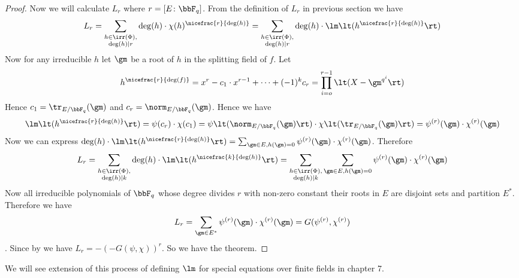 \begin{proof}
  Now we will calculate $L_r$  where $r=[E\colon \bbF_q]$. From the definition of $L_r$ in previous section we have $$L_r =  \sum_{\substack{h\in\irr(\Phi),\\ \deg(h)\mid r}}\deg(h)\cdot \chi(h)^{\nicefrac{r}{\deg(h)}}= \sum_{\substack{h\in\irr(\Phi),\\ \deg(h)\mid r}} \deg(h)\cdot \lm\lt( h^{\nicefrac{r}{\deg(h)}}\rt)$$Now for any irreducible $h$ let $\gm$ be a root of $h$ in the splitting field of $f$. Let $$h^{\nicefrac{r}{\deg(f)}}= x^r-c_1\cdot x^{r-1}+\cdots+(-1)^k c_r=\prod_{i=o}^{r-1}\lt(X-\gm^{q^i}\rt)$$Hence 
  $c_1=\tr_{E/\bbF_q}(\gm)$ and $c_r=\norm_{E/\bbF_q}(\gm)$. Hence we have $$\lm\lt(h^{\nicefrac{r}{\deg(h)}}\rt)=\psi(c_r)\cdot \chi(c_1)=\psi\lt(\norm_{E/\bbF_q}(\gm)\rt)\cdot \chi\lt(\tr_{E/\bbF_q}(\gm)\rt)=\psi^{(r)}(\gm)\cdot \chi^{(r)}(\gm)$$Now we can express $\deg(h)\cdot \lm\lt(h^{\nicefrac{r}{\deg(h)}}\rt)=\sum_{\gm\in E,h(\gm)=0}\psi^{(r)}(\gm)\cdot \chi^{(r)}(\gm)$. 
  Therefore $$L_r= \sum_{\substack{h\in\irr(\Phi),\\ \deg(h)\mid k}} \deg(h)\cdot \lm\lt( h^{\nicefrac{k}{\deg(h)}}\rt)=\sum_{\substack{h\in\irr(\Phi),\\ \deg(h)\mid k}}\sum_{\gm\in E,h(\gm)=0}\psi^{(r)}(\gm)\cdot \chi^{(r)}(\gm) $$Now all irreducible polynomials of $\bbF_q$ whose degree divides $r$ with non-zero constant their roots in $E$ are disjoint sets and partition $E^*$. Therefore we have $$L_r=\sum_{\gm\in E^*}\psi^{(r)}(\gm)\cdot \chi^{(r)}(\gm)=G(\psi^{(r)},\chi^{(r)})$$. Since  by  we have $L_r=-(-G(\psi,\chi))^r$. So we have the theorem. 
\end{proof}

We will see extension of this process of defining $\lm$ for special equations over finite fields in chapter 7.


